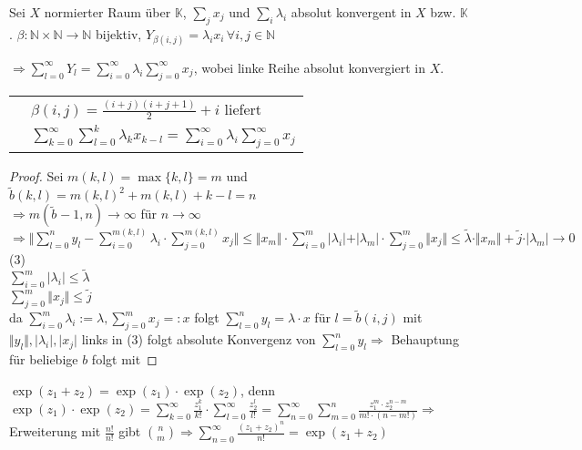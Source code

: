 \begin{proposition}
	Sei $X$ normierter Raum über $\mathbb{K}$, $\sum_j x_j$ und $\sum_i \lambda_i$ absolut konvergent in $X$ bzw. $\mathbb{K}$. $\beta:\mathbb{N}\times \mathbb{N}\rightarrow \mathbb{N}$ bijektiv, $Y_{\beta(i,j)} = \lambda_i x_i\,\forall i,j\in\mathbb{N}$
	
	$\Rightarrow \sum_{l=0}^\infty Y_l = \sum_{i=0}^\infty \lambda_i \sum_{j=0}^\infty x_j$, wobei linke Reihe absolut konvergiert in $X$.
	
	\begin{tabular}{ll}
		\highlight{Spezialfall:} & $\beta(i,j) = \frac{(i+j)(i+j+1)}{2} + i$ liefert\\[5pt]
		& $\sum_{k=0}^\infty \sum_{l=0}^k \lambda_k x_{k-l} = \sum_{i=0}^\infty \lambda_i \sum_{j=0}^\infty x_j$
	\end{tabular}
\end{proposition}
\begin{proof}
	Sei $m(k,l)=\max\{k,l\}=m$ und $\tilde{b}(k,l)=m(k,l)^2+m(k,l)+k-l=n$ \\
	$\Rightarrow m(\tilde{b}^{}-1,n)\to\infty$ für $n\to\infty$ \\
	$\Rightarrow\Vert\sum_{l=0}^{n} y_l-\sum_{i=0}^{m(k,l)} \lambda_i\cdot\sum_{j=0}^{m(k,l)} x_j\Vert\le \Vert x_m\Vert\cdot\sum_{i=0}^m \vert\lambda_i\vert+\vert\lambda_m\vert\cdot\sum_{j=0}^m \Vert x_j\Vert\le \tilde{\lambda}\cdot\Vert x_m\Vert+\tilde{j}\cdot\vert \lambda_m\vert\to 0$ (3) \\
	$\sum_{i=0}^m \vert\lambda_i\vert\le \tilde{\lambda}$ \\
	$\sum_{j=0}^m \Vert x_j\Vert\le \tilde{j}$ \\
	da $\sum_{i=0}^m \lambda_i := \lambda, \sum_{j=0}^m x_j=:x$ folgt $\sum_{l=0}^n y_l=\lambda\cdot x$ für $l=\tilde{b}(i,j)$ mit $\Vert y_l\Vert,\vert\lambda_i\vert,\vert x_j\vert$ links in (3) folgt absolute Konvergenz von $\sum_{l=0}^n y_l \Rightarrow$ Behauptung für beliebige $b$ folgt mit 
\end{proof}

\begin{example}
	$\exp(z_1+z_2)=\exp(z_1)\cdot\exp(z_2)$, denn \\
	$\exp(z_1)\cdot\exp(z_2)=\sum_{k=0}^{\infty} \frac{z_1^k}{k!}\cdot\sum_{l=0}^{\infty} \frac{z_2^l}{l!}=\sum_{n=0}^{\infty}\sum_{m=0}^{n}\frac{z_1^m\cdot z_2^{n-m}}{m!\cdot (n-m!)}\Rightarrow$ Erweiterung mit $\frac{n!}{n!}$ gibt $\binom{n}{m}\Rightarrow\sum_{n=0}^{\infty} \frac{(z_1+z_2)^n}{n!}=\exp(z_1+z_2)$
\end{example}


